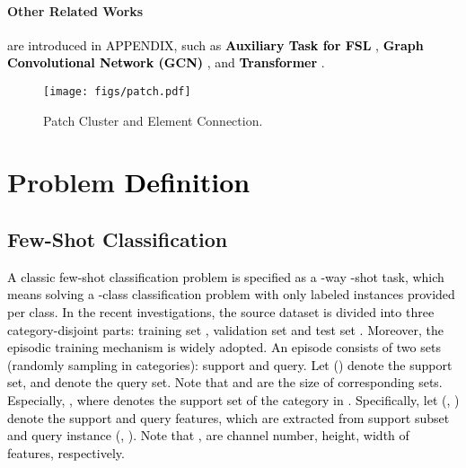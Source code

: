 \documentclass{article}
\newcommand{\ljx}[1]{\textcolor{black}{#1}}
\newcommand{\seasons}[1]{\textcolor{black}{#1}}
\newcommand{\jinxiang}[1]{\textcolor{black}{#1}}
\begin{document}
\paragraph{Other Related Works}
\jinxiang{are introduced in APPENDIX, such as \textbf{Auxiliary Task for FSL} \cite{hou2019cross,rizve2021exploring}, \textbf{Graph Convolutional Network (GCN)} \cite{bruna2013spectral}, and \textbf{Transformer} \cite{vaswani2017attention}.}


\begin{figure}[!t]
\centering
\texttt{[image: figs/patch.pdf]}
\caption{Patch Cluster and Element Connection.}
\label{fig:patch}
\end{figure}

\section{Problem \seasons{Definition}}
\subsection{Few-Shot Classification}
\label{sec:ProblemDef}
\seasons{A classic few-shot classification problem is specified as a -way -shot task, which means solving a -class classification problem with only  labeled instances provided per class.
In the recent investigations\cite{hou2019cross,snell2017prototypical}, the source dataset is divided into three category-disjoint parts: training set , validation set  and test set .
Moreover, the episodic training mechanism is widely adopted.
An episode consists of two sets (randomly sampling in  categories): support and query. Let  () denote the support set, and  denote the query set.
Note that  and  are the size of corresponding sets.
Especially, , where  denotes the support set of the  category in .}
\ljx{\seasons{Specifically}, let (, )  denote the support and query features, which are extracted from support subset and query instance (, ). Note that  ,  are channel number, height, width of features, respectively.}
\end{document}
